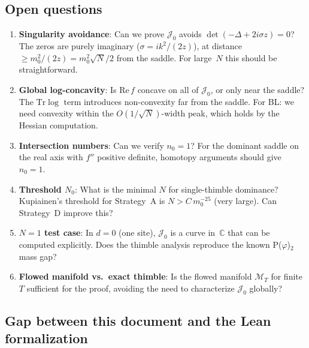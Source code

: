 \documentclass[12pt]{article}
\theoremstyle{definition}
\theoremstyle{remark}
\newcommand{\C}{\mathbb{C}}
\newcommand{\Tr}{\mathrm{Tr}}
\newcommand{\ph}{\varphi}
\newcommand{\re}{\mathrm{Re}}
\begin{document}
\subsection{Open questions}

\begin{enumerate}
\item \textbf{Singularity avoidance}: Can we prove $\mathcal{J}_0$
  avoids $\det(-\Delta+2i\sigma z) = 0$? The zeros are purely
  imaginary ($\sigma = ik^2/(2z)$), at distance $\ge m_0^2/(2z)
  = m_0^2\sqrt{N}/2$ from the saddle. For large~$N$ this should
  be straightforward.
\item \textbf{Global log-concavity}: Is $\re\,f$ concave on all
  of $\mathcal{J}_0$, or only near the saddle? The $\Tr\log$ term
  introduces non-convexity far from the saddle. For BL: we need
  convexity within the $O(1/\sqrt{N})$-width peak, which holds by
  the Hessian computation.
\item \textbf{Intersection numbers}: Can we verify $n_0 = 1$?
  For the dominant saddle on the real axis with $f''$ positive
  definite, homotopy arguments should give $n_0 = 1$.
\item \textbf{Threshold $N_0$}: What is the minimal $N$ for
  single-thimble dominance? Kupiainen's threshold for Strategy~A
  is $N > C\,m_0^{-25}$ (very large). Can Strategy~D improve this?
\item \textbf{$N = 1$ test case}: In $d = 0$ (one site),
  $\mathcal{J}_0$ is a curve in~$\C$ that can be computed
  explicitly. Does the thimble analysis reproduce the known
  P($\ph$)$_2$ mass gap?
\item \textbf{Flowed manifold vs.\ exact thimble}: Is the flowed
  manifold $\mathcal{M}_T$ for finite~$T$ sufficient for the
  proof, avoiding the need to characterize $\mathcal{J}_0$ globally?
\end{enumerate}

\subsection{Gap between this document and the Lean formalization}
\end{document}
